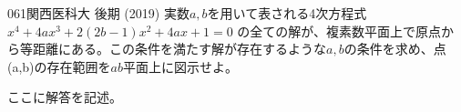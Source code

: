 \begin{prob}{061}{}{関西医科大 後期 (2019)}
 実数$a,b$を用いて表される4次方程式 $x^4+4ax^3+2(2b-1)x^2+4ax+1=0$ の全ての解が、複素数平面上で原点から等距離にある。この条件を満たす解が存在するような$a,b$の条件を求め、点(a,b)の存在範囲を$ab$平面上に図示せよ。
\end{prob}
ここに解答を記述。